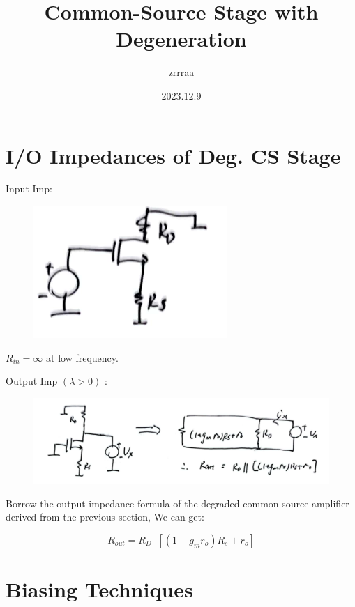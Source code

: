 \documentclass[fontset=windows]{article}
\title{\heiti\zihao{2} Common-Source Stage with Degeneration}
\author{\songti zrrraa}
\date{2023.12.9}
\begin{document}
\maketitle
\thispagestyle{empty}

\section*{I/O Impedances of Deg. CS Stage}

Input Imp:

\begin{figure}[htbp]
    \centering
    \includegraphics[scale=0.6]{1.jpg}
    \captionsetup{labelformat=empty}
    \caption{}
    \label{1}
\end{figure}

$R_{in}=\infty$ at low frequency. 

Output Imp $(\lambda>0)$ : 

\begin{figure}[htbp]
    \centering
    \includegraphics[scale=0.6]{2.jpg}
    \captionsetup{labelformat=empty}
    \caption{}
    \label{2}
\end{figure}

Borrow the output impedance formula of the degraded common source amplifier derived from the previous section, We can get: 

$$R_{out}=R_D||[(1+g_mr_o)R_s+r_o]$$

\section*{Biasing Techniques}
\end{document}
